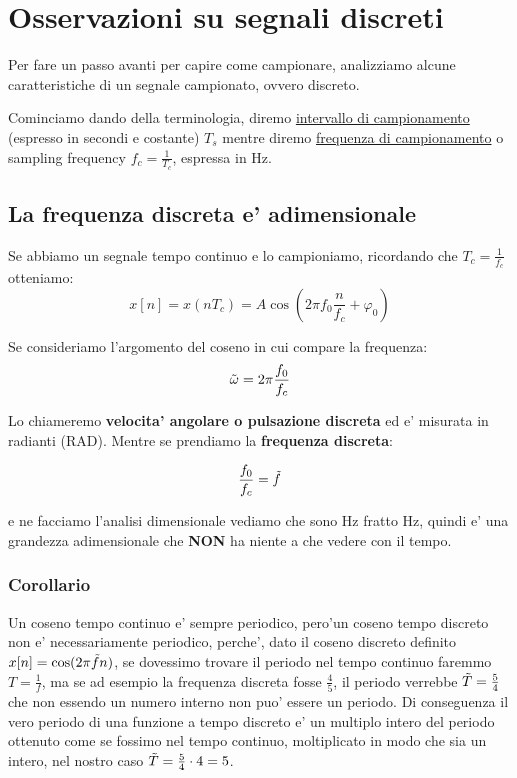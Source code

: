 \section{Osservazioni su segnali discreti}
Per fare un passo avanti per capire come campionare, analizziamo alcune caratteristiche di un segnale campionato, ovvero discreto.

Cominciamo dando della terminologia, diremo \underline{intervallo di campionamento} (espresso in secondi e costante) $T_s$ mentre diremo \underline{frequenza di campionamento} o sampling frequency $f_c = \frac{1}{T_c}$, espressa in Hz.

\subsection{La frequenza discreta e' adimensionale}
Se abbiamo un segnale tempo continuo e lo campioniamo, ricordando che $T_c = \frac{1}{f_c}$ otteniamo:
\[
    x[n] = x(n T_c) = A \cos{(2\pi f_0 \frac{n}{f_c} + \varphi_0)}
\]

Se consideriamo l'argomento del coseno in cui compare la frequenza:
\[
    \Tilde{\omega} = 2\pi \frac{f_0}{f_c}
\]

Lo chiameremo \textbf{velocita' angolare o pulsazione discreta} ed e' misurata in radianti (RAD).
Mentre se prendiamo la \textbf{frequenza discreta}:

\[
    \frac{f_0}{f_c} = \Tilde{f}
\]

e ne facciamo l'analisi dimensionale vediamo che sono Hz fratto Hz, quindi e' una grandezza adimensionale che \textbf{NON} ha niente a che vedere con il tempo.

\subsubsection{Corollario}
Un coseno tempo continuo e' sempre periodico, pero'un coseno tempo discreto non e' necessariamente periodico, perche', dato il coseno discreto definito $x[n] = \cos(2\pi \Tilde{f} n)$, se dovessimo trovare il periodo nel tempo continuo faremmo $T = \frac{1}{f}$, ma se ad esempio la frequenza discreta fosse $\frac{4}{5}$, il periodo verrebbe $\Tilde{T} = \frac{5}{4}$ che non essendo un numero interno non puo' essere un periodo.
Di conseguenza il vero periodo di una funzione a tempo discreto e' un multiplo intero del periodo ottenuto come se fossimo nel tempo continuo, moltiplicato in modo che sia un intero, nel nostro caso $\Tilde{T} = \frac{5}{4} \cdot 4 = 5$.

